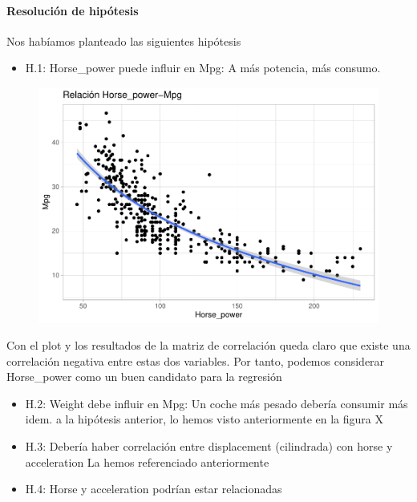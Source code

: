 \paragraph{Resolución de hipótesis}

Nos habíamos planteado las siguientes hipótesis

\begin{itemize}
\item H.1: Horse\_power puede influir en Mpg: A más potencia, más consumo.
\end{itemize}

\begin{figure}[H]\includegraphics[width=.9\linewidth]{img/EDA_files/figure-latex/unnamed-chunk-27-1} \caption{}\end{figure}

Con el plot y los resultados de la matriz de correlación queda claro que existe una correlación negativa entre estas dos variables. Por tanto, podemos considerar Horse\_power como un buen candidato para la regresión

\begin{itemize}
\item H.2: Weight debe influir en Mpg: Un coche más pesado debería consumir más idem. a la hipótesis anterior, lo hemos visto anteriormente en la figura X
\item H.3: Debería haber correlación entre displacement (cilindrada) con horse y acceleration La hemos referenciado anteriormente
\item H.4: Horse y acceleration podrían estar relacionadas
\end{itemize}

